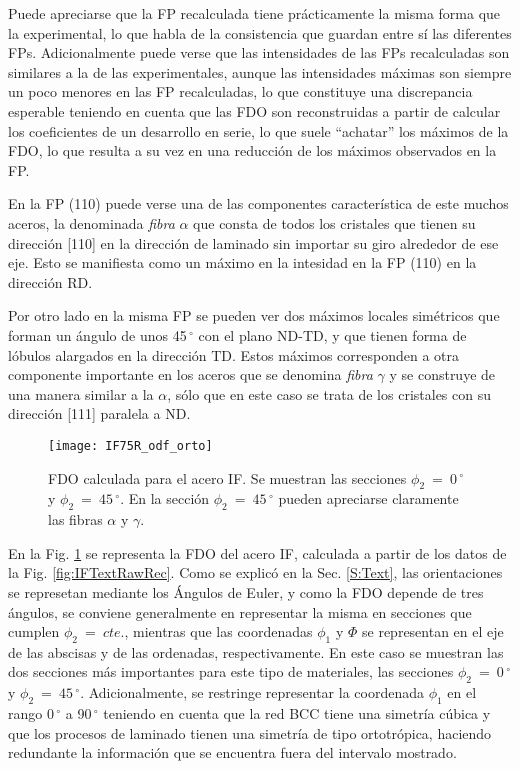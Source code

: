 Puede apreciarse que la FP recalculada tiene prácticamente la misma forma que la experimental, lo que habla de la consistencia que guardan entre sí las diferentes FPs.
Adicionalmente puede verse que las intensidades de las FPs recalculadas son similares a la de las experimentales, aunque las intensidades máximas son siempre un poco menores en las FP recalculadas, lo que constituye una discrepancia esperable teniendo en cuenta que las FDO son reconstruidas a partir de calcular los coeficientes de un desarrollo en serie, lo que suele ``achatar'' los máximos de la FDO, lo que resulta a su vez en una reducción de los máximos observados en la FP.

En la FP (110) puede verse una de las componentes característica de este muchos aceros, la denominada \textit{fibra} $\alpha$ que consta de todos los cristales que tienen su dirección [110] en la dirección de laminado sin importar su giro alrededor de ese eje. Esto se manifiesta como un máximo en la intesidad en la FP (110) en la dirección RD.

Por otro lado en la misma FP se pueden ver dos máximos locales simétricos que forman un ángulo de unos 45\,$^{\circ}$ con el plano ND-TD, y que tienen forma de lóbulos alargados en la dirección TD. 
Estos máximos corresponden a otra componente importante en los aceros que se denomina \textit{fibra} $\gamma$ y se construye de una manera similar a la $\alpha$, sólo que en este caso se trata de los cristales con su dirección [111] paralela a ND.

\begin{figure}[!htb]
  \centering
  \texttt{[image: IF75R\_odf\_orto]}
  \caption{FDO calculada para el acero IF. Se muestran las secciones $\phi_2 \ = \ 0$\,$^{\circ}$ y $\phi_2 \ = \ 45$\,$^{\circ}$. En la sección $\phi_2 \ = \ 45$\,$^{\circ}$ pueden apreciarse claramente las fibras $\alpha$ y $\gamma$.}
  \label{fig:IFODF}
\end{figure}

En la Fig. \ref{fig:IFODF} se representa la FDO del acero IF, calculada a partir de los datos de la Fig. \ref{fig:IFTextRawRec}.
Como se explicó en la Sec. \ref{S:Text}, las orientaciones se represetan mediante los Ángulos de Euler, y como la FDO depende de tres ángulos, se conviene generalmente en representar la misma en secciones que cumplen $\phi_2 \ = \ cte.$, mientras que las coordenadas $\phi_1$ y $\Phi$ se representan en el eje de las abscisas y de las ordenadas, respectivamente.
En este caso se muestran las dos secciones más importantes para este tipo de materiales, las secciones $\phi_2 \ = \ 0$\,$^{\circ}$ y $\phi_2 \ = \ 45$\,$^{\circ}$.
Adicionalmente, se restringe representar la coordenada $\phi_1$ en el rango 0\,$^{\circ}$ a 90\,$^{\circ}$ teniendo en cuenta que la red BCC tiene una simetría cúbica y que los procesos de laminado tienen una simetría de tipo ortotrópica, haciendo redundante la información que se encuentra fuera del intervalo mostrado.

